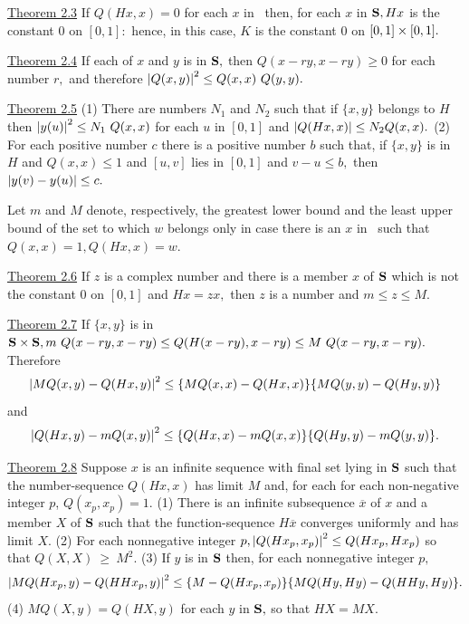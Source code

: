 \underline{Theorem 2.3}  If $Q(Hx,x) = 0$ for each $x$ in \bs~then, for each $x$ in $\textbf{S}, Hx$ is the constant $0$ on $[0, 1]:$  hence, in this case, $K$ is the constant $0$ on $[0,1] \times [0,1].$  \nl

\underline{Theorem 2.4}  If each of $x$ and $y$ is in $\textbf{S},$ then $Q(x - ry, x - ry) \geq 0$ for each number $r,$ and therefore $\left|Q(x, y)\right|^{2} \leq Q(x, x)~Q(y, y).$ \nl



\underline{Theorem 2.5}\nl
\indent (1) There are numbers $N_{1}$ and $N_{2}$ such that if $\{x, y\}$ belongs to $H$ then
$\left|y(u)\right|^{2} \leq N_{1}~Q(x,x)$ for each $u$ in $[0,1]$ and $\left|Q(Hx, x)\right| \leq N_{2}Q(x, x).$\nl
\indent (2) For each positive number $c$ there is a positive number $b$
such that, if $\{x, y\}$ is in $H$ and $Q(x, x) \leq 1$ and $[u, v]$ lies in $[0, 1]$
and $v - u \leq b,$ then $\left|y(v) - y(u)\right| \leq c.$


Let $m$ and $M$ denote, respectively, the greatest lower bound and the least upper bound of the set to which $w$ belongs only in case there is an $x$ in \bs ~such that $Q(x,x) = 1, Q(Hx, x) = w.$ \nl

\underline{Theorem 2.6}  If $z$ is a complex number and there is a member $x$ of $\textbf{S}$ which is not the constant $0$ on $[0, 1]$ and $Hx = zx,$ then $z$ is a number and $m \leq z \leq M.$ \nl

\underline{Theorem 2.7}  If $\{x, y\}$ is in $\textbf{S} \times \textbf{S}, m~Q(x-ry,x-ry) \leq Q(H(x-ry),x-ry) \leq M~Q(x-ry,x-ry).$   Therefore
\[
\left|MQ(x,y) - Q(Hx,y)\right|^{2} \leq \{MQ(x,x) - Q(Hx,x)\} \{MQ(y,y) - Q(Hy,y)\}
\]
and
\[
\left|Q(Hx,y) - mQ(x,y)\right|^{2} \leq \{Q(Hx,x) - mQ(x,x)\} \{Q(Hy,y) - mQ(y,y)\}.
\]

\np

\underline{Theorem 2.8}  Suppose $x$ is an infinite sequence with final set lying in $\textbf{S}$ such that the number-sequence $Q(Hx, x)$ has limit $M$ and, for each for each non-negative integer $p$, $Q(x_{p}, x_{p}) = 1.$\nl
\indent (1) There is an infinite subsequence $\overline{x}$ of $x$ and a member $X$ of $\textbf{S}$ such that the function-sequence $H\overline{x}$ converges uniformly and has limit $X.$\nl
\indent (2) For each nonnegative integer $p, \left|Q(Hx_{p},x_{p})\right|^{2} \leq Q(Hx_{p}, Hx_{p})$ so that $Q(X,X)~\geq ~M^{2}$.\nl
\indent (3) If $y$ is in $\textbf{S}$ then, for each nonnegative integer $p,$\nl
\[
\left|MQ(Hx_{p}, y) - Q(HHx_{p},y)\right|^{2} \leq \{M - Q(Hx_{p},x_{p})\}  \{MQ(Hy,Hy) - Q(HHy, Hy)\}.
\]
\indent (4) $MQ(X,y) = Q(HX,y)$ for each $y$ in $\textbf{S},$ so that $HX = MX.$ \nl

